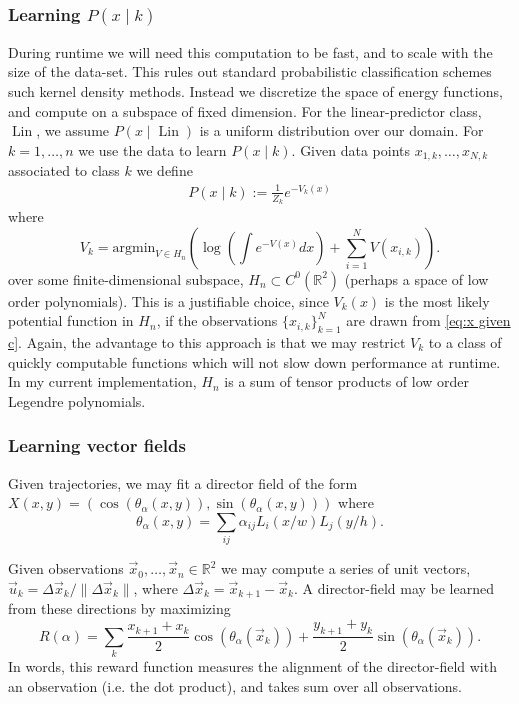\documentclass[12pt]{amsart}
\DeclareMathOperator{\Lin}{Lin}
\begin{document}
\subsubsection{Learning $P(x \mid k)$ }
During runtime we will need this computation to be fast, and to scale with the size of the data-set.
This rules out standard probabilistic classification schemes such kernel density methods.
Instead we discretize the space of energy functions, and compute on a subspace of fixed dimension.
For the linear-predictor class, $\Lin$, we assume $P(x \mid \Lin )$ is a uniform distribution over our domain.
For $k = 1, \dots, n$ we use the data to learn $P(x \mid k)$.
Given data points $x_{1,k},\dots,x_{N,k}$ associated to class $k$ we define
\begin{align}
	P(x \mid k) := \frac{1}{Z_k } e^{-V_k(x) } \label{eq:x given c}
\end{align}
where
$$
	V_k =  \text{argmin}_{V \in H_n}  \left( \log \left( \int e^{ - V(x) } dx \right) + \sum_{i=1}^N V(x_{i,k} ) \right).
$$
over some finite-dimensional subspace, $H_n \subset C^0( \mathbb{R}^2)$ (perhaps a space of low order polynomials).
This is a justifiable choice, since $V_k(x)$ is the most likely potential function in $H_n$, if the observations $\{ x_{i,k}\}_{k=1}^N$ are drawn from \eqref{eq:x given c}.
Again, the advantage to this approach is that we may restrict $V_k$ to a class of quickly computable functions which will not slow down performance at runtime.
In my current implementation, $H_n$ is a sum of tensor products of low order Legendre polynomials.

\subsubsection{Learning vector fields}
Given trajectories, we may fit a director field of the form $X(x,y) = ( \cos( \theta_\alpha(x,y) ) , \sin( \theta_\alpha(x,y) ) )$
where 
$$
	\theta_\alpha(x,y) = \sum_{ij} \alpha_{ij} L_i(x / w) L_j(y / h).
$$


Given observations $\vec{x}_0,  \dots, \vec{x}_n \in \mathbb{R}^2$ we may compute a series of unit vectors, $\vec{u}_k = \Delta \vec{x}_k / \| \Delta \vec{x}_k  \|$,
where $\Delta \vec{x}_k = \vec{x}_{k+1} - \vec{x}_k$.
A director-field may be learned from these directions by maximizing
$$
	R(\alpha ) = \sum_{k} \frac{x_{k+1} + x_k}{2} \cos( \theta_\alpha(\vec{x}_k) ) + \frac{y_{k+1} + y_k}{2}  \sin( \theta_\alpha( \vec{x}_k ) ).
$$
In words, this reward function measures the alignment of the director-field with an observation (i.e. the dot product), and takes sum over all observations.
\end{document}
